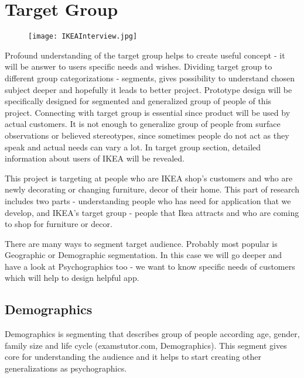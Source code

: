 \section{Target Group}
\begin{figure}[H]
\centering
\texttt{[image: IKEAInterview.jpg]}
\end{figure}
Profound understanding of the target group helps to create useful concept - it will be answer to users specific needs and wishes. Dividing target group to different group categorizations - segments, gives possibility to understand chosen subject deeper and hopefully it leads to better project. Prototype design will be specifically designed for segmented and generalized group of people of this project. Connecting with target group is essential since product will be used by actual customers. It is not enough to generalize group of people from surface observations or believed stereotypes, since sometimes people do not act as they speak and actual needs can vary a lot. In target group section, detailed information about users of IKEA will be revealed.

This project is targeting at people who are IKEA shop’s customers and who are newly decorating or changing furniture, decor of their home. This part of research includes two parts - understanding people who has need for application that we develop, and IKEA’s target group - people that Ikea attracts  and who are coming to shop for furniture or decor.

There are many ways to segment target audience. Probably most popular is Geographic or Demographic segmentation. In this case we will go deeper and have a look at Psychographics too - we want to know specific needs of customers which will help to design helpful app. 

\subsection{Demographics }
Demographics is segmenting that describes group of people according age, gender, family size and life cycle (examstutor.com, Demographics). This segment gives core for understanding the audience and it helps to start creating other generalizations as psychographics.

